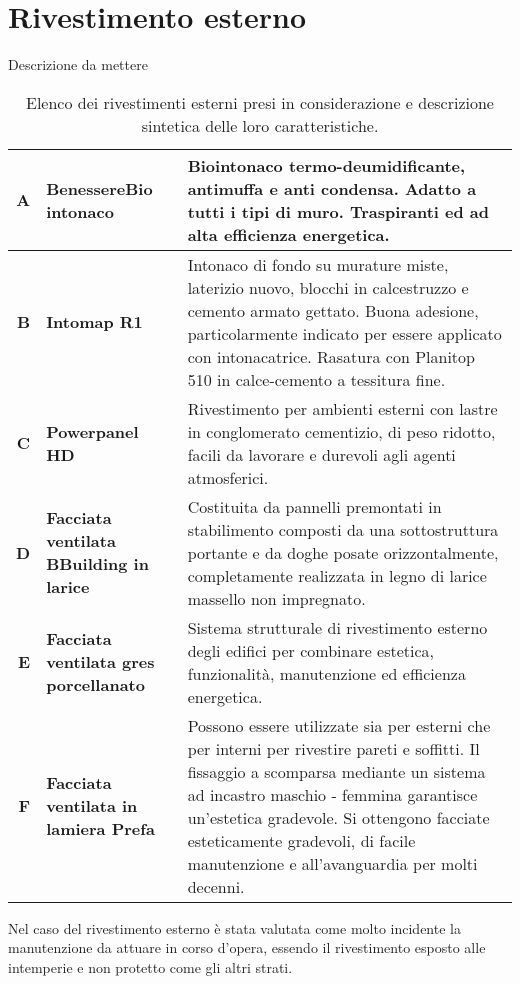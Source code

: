 \section{Rivestimento esterno}
Descrizione da mettere
\begin{table}[H]
\caption{Elenco dei rivestimenti esterni presi in considerazione e descrizione sintetica delle loro caratteristiche.}
\centering
\begin{tabularx}{\textwidth}{rXX}
    \toprule
        \textbf{A} & \textbf{BenessereBio intonaco} & Biointonaco termo-deumidificante, antimuffa e anti condensa. 
        Adatto a tutti i tipi di muro. Traspiranti ed ad alta efficienza energetica. \\\midrule
        \textbf{B} & \textbf{Intomap R1 } & Intonaco di fondo su murature miste, laterizio nuovo, blocchi in calcestruzzo e cemento armato gettato.  Buona adesione, particolarmente indicato per essere applicato con intonacatrice. 
        Rasatura con Planitop 510 in calce-cemento a tessitura fine.\\\midrule
        \textbf{C} & \textbf{Powerpanel HD} & Rivestimento per ambienti esterni con lastre in conglomerato cementizio, di peso ridotto, facili da lavorare e durevoli agli agenti atmosferici.\\\midrule
        \textbf{D} & \textbf{Facciata ventilata BBuilding in larice} & Costituita da pannelli premontati in stabilimento composti da una sottostruttura portante e da doghe posate orizzontalmente, completamente realizzata in legno di larice massello non impregnato.\\\midrule
        \textbf{E} & \textbf{Facciata ventilata gres porcellanato} & Sistema strutturale di rivestimento esterno degli edifici per combinare estetica, funzionalità, manutenzione ed efficienza energetica. \\\midrule
        \textbf{F} & \textbf{Facciata ventilata in lamiera Prefa} & Possono essere utilizzate sia per esterni che per interni per rivestire pareti e soffitti. Il fissaggio a scomparsa mediante un sistema ad incastro maschio - femmina garantisce un'estetica gradevole. Si ottengono facciate esteticamente gradevoli, di facile manutenzione e all'avanguardia per molti decenni.\\
    \bottomrule
\end{tabularx}
\end{table}
Nel caso del rivestimento esterno è stata valutata come molto incidente la manutenzione da attuare in corso d'opera, essendo il rivestimento esposto alle intemperie e non protetto come gli altri strati. 
